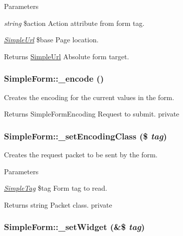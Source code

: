 \begin{DoxyParams}{Parameters}
\item[{\em string}]\$action Action attribute from form tag. \item[{\em \hyperlink{class_simple_url}{SimpleUrl}}]\$base Page location. \end{DoxyParams}
\begin{DoxyReturn}{Returns}
\hyperlink{class_simple_url}{SimpleUrl} Absolute form target. 
\end{DoxyReturn}
\hypertarget{class_simple_form_af96fd0c11987ec8195b0ac84164483c2}{
\subsubsection[{\_\-encode}]{\setlength{\rightskip}{0pt plus 5cm}SimpleForm::\_\-encode ()}}
\label{class_simple_form_af96fd0c11987ec8195b0ac84164483c2}
Creates the encoding for the current values in the form. \begin{DoxyReturn}{Returns}
SimpleFormEncoding Request to submit.  private 
\end{DoxyReturn}
\hypertarget{class_simple_form_a0aa82cd7ab715d5c6d7de6358a0945e6}{
\subsubsection[{\_\-setEncodingClass}]{\setlength{\rightskip}{0pt plus 5cm}SimpleForm::\_\-setEncodingClass (\$ {\em tag})}}
\label{class_simple_form_a0aa82cd7ab715d5c6d7de6358a0945e6}
Creates the request packet to be sent by the form. 
\begin{DoxyParams}{Parameters}
\item[{\em \hyperlink{class_simple_tag}{SimpleTag}}]\$tag Form tag to read. \end{DoxyParams}
\begin{DoxyReturn}{Returns}
string Packet class.  private 
\end{DoxyReturn}
\hypertarget{class_simple_form_a2e83f01911ebc78292113a0176171793}{
\subsubsection[{\_\-setWidget}]{\setlength{\rightskip}{0pt plus 5cm}SimpleForm::\_\-setWidget (\&\$ {\em tag})}}

